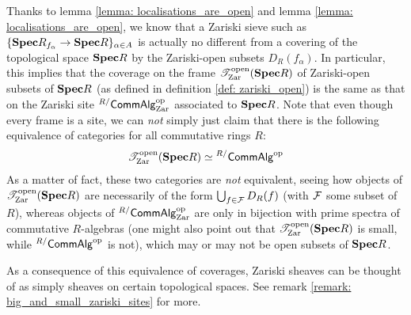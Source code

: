                     \begin{corollary} \label{coro: zariski_frames_and_sites}
                        Thanks to lemma \ref{lemma: localisations_are_open} and lemma \ref{lemma: localisations_are_open}, we know that a Zariski sieve such as $\{\mathbf{Spec} R_{f_{\alpha}} \to \mathbf{Spec} R\}_{\alpha \in A}$ is actually no different from a covering of the topological space $\mathbf{Spec} R$ by the Zariski-open subsets $D_R(f_{\alpha})$. In particular, this implies that the coverage on the frame $\mathscr{T}^{\mathrm{open}}_{\mathrm{Zar}}(\mathbf{Spec} R)$ of Zariski-open subsets of $\mathbf{Spec} R$ (as defined in definition \ref{def: zariski_open}) is the same as that on the Zariski site ${}^{R/}\mathsf{Comm}\mathsf{Alg}_{\mathrm{Zar}}^{\mathrm{op}}$ associated to $\mathbf{Spec} R$. Note that even though every frame is a site, we can \textit{not} simply just claim that there is the following equivalence of categories for all commutative rings $R$:
                            $$\mathscr{T}^{\mathrm{open}}_{\mathrm{Zar}}(\mathbf{Spec} R) \simeq {}^{R/}\mathsf{Comm}\mathsf{Alg}^{\mathrm{op}}$$
                        As a matter of fact, these two categories are \textit{not} equivalent, seeing how objects of $\mathscr{T}^{\mathrm{open}}_{\mathrm{Zar}}(\mathbf{Spec} R)$ are necessarily of the form $\bigcup_{f \in \mathcal{F}} D_R(f)$ (with $\mathcal{F}$ some subset of $R$), whereas objects of ${}^{R/}\mathsf{Comm}\mathsf{Alg}_{\mathrm{Zar}}^{\mathrm{op}}$ are only in bijection with prime spectra of commutative $R$-algebras (one might also point out that $\mathscr{T}^{\mathrm{open}}_{\mathrm{Zar}}(\mathbf{Spec} R)$ is small, while ${}^{R/}\mathsf{Comm}\mathsf{Alg}^{\mathrm{op}}$ is not), which may or may not be open subsets of $\mathbf{Spec} R$. 
                        
                        As a consequence of this equivalence of coverages, Zariski sheaves can be thought of as simply sheaves on certain topological spaces. See remark \ref{remark: big_and_small_zariski_sites} for more.
                    \end{corollary}
